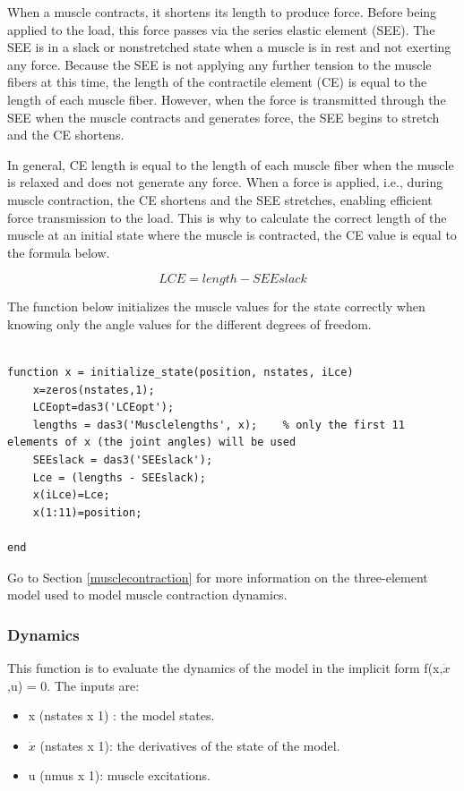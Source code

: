 When a muscle contracts, it shortens its length to produce force. Before being applied to the load, this force passes via the series elastic element (SEE). The SEE is in a slack or nonstretched state when a muscle is in rest and not exerting any force. Because the SEE is not applying any further tension to the muscle fibers at this time, the length of the contractile element (CE) is equal to the length of each muscle fiber. However, when the force is transmitted through the SEE when the muscle contracts and generates force, the SEE begins to stretch and the CE shortens. 

In general, CE length is equal to the length of each muscle fiber when the muscle is relaxed and does not generate any force. When a force is applied, i.e., during muscle contraction, the CE shortens and the SEE stretches, enabling efficient force transmission to the load. This is why to calculate the correct length of the muscle at an initial state where the muscle is contracted, the CE value is equal to the formula below.

\begin{equation}
    LCE = length - SEEslack \label{LCE}
\end{equation}

The function below initializes the muscle values for the state correctly when knowing only the angle values for the different degrees of freedom.

\begin{lstlisting}[style=Matlab-editor]

function x = initialize_state(position, nstates, iLce)
    x=zeros(nstates,1);
    LCEopt=das3('LCEopt');
    lengths = das3('Musclelengths', x);    % only the first 11 elements of x (the joint angles) will be used
    SEEslack = das3('SEEslack');
    Lce = (lengths - SEEslack);
    x(iLce)=Lce;
    x(1:11)=position;

end
\end{lstlisting}

Go to Section \ref{musclecontraction} for more information on the three-element model used to model muscle contraction dynamics. \newline

\subsubsection{Dynamics}
This function is to evaluate the dynamics of the model in the implicit form f(x,$\dot{x}$,u) = 0.
The inputs are:
\begin{itemize}
    \item x (nstates x 1) : the model states.
    \item $\dot{x}$ (nstates x 1): the derivatives of the state of the model.
    \item u (nmus x 1): muscle excitations.
\end{itemize}

